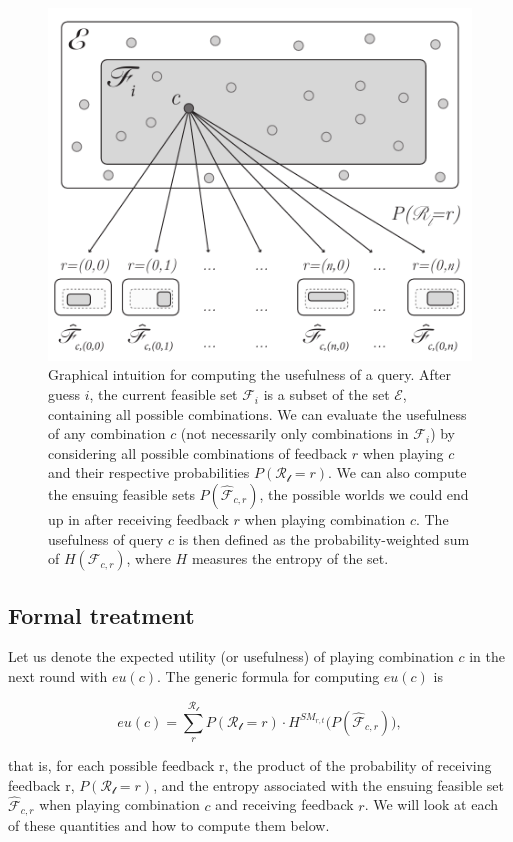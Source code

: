 \documentclass[12pt]{article}
\begin{document}
\begin{figure}[h]
\centering
\includegraphics[width=.65\textwidth]{graphical-intuition}
\caption[Graphical Intuition]{Graphical intuition for computing the usefulness of a query. After guess $i$, the current feasible set $\mathcal{F}_i$ is a subset of the set $\mathcal{E}$, containing all possible combinations. We can evaluate the usefulness of any combination $c$ (not necessarily only combinations in $\mathcal{F}_i$) by considering all possible combinations of feedback $r$ when playing $c$ and their respective probabilities $P(\mathcal{R_l}=r)$. We can also compute the ensuing feasible sets $P(\mathcal{\hat{F}}_{c,r})$, the possible worlds we could end up in after receiving feedback $r$ when playing combination $c$. The usefulness of query $c$ is then defined as the probability-weighted sum of $H(\mathcal{F}_{c,r})$, where $H$ measures the entropy of the set.}
\label{fig:u}
\end{figure}


\subsection{Formal treatment}

Let us denote the expected utility (or usefulness) of playing combination $c$ in the next round with $eu(c)$. The generic formula for computing $eu(c)$ is


\begin{equation} 
eu(c) = \sum_r^{\mathcal{R_l}}  P(\mathcal{R_l}=r) \cdot H^{SM_{r,t}} \Big ( P(\mathcal{\hat{F}}_{c,r}) \Big ),
\label{eq:u}
\end{equation} 


that is, for each possible feedback r, the product of the probability of receiving feedback r, $P(\mathcal{R_l}=r)$, and the entropy associated with the ensuing feasible set $\mathcal{\hat{F}}_{c,r}$ when playing combination $c$ and receiving feedback $r$. We will look at each of these quantities and how to compute them below.
\end{document}
